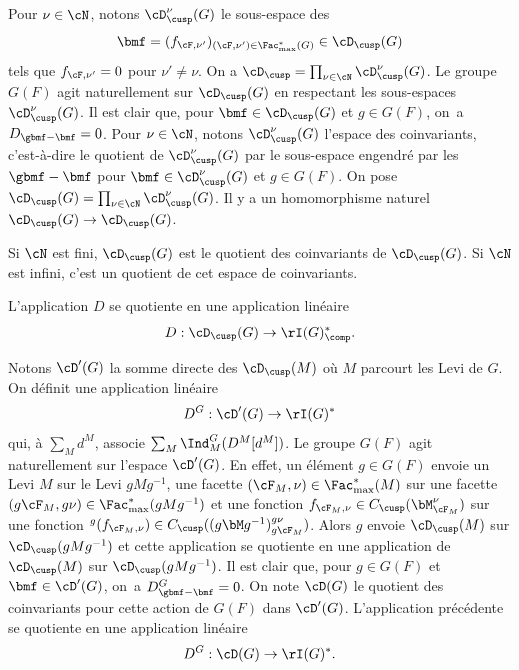 Pour $\nu\in \cN$, notons $\boldsymbol{\cD}^{\nu}_{\cusp}(G)$ le sous-espace des
\[
\bmf=(f_{\cF,\nu'})_{(\cF,\nu')\in \Fac^*_{\max}(G)}\in \boldsymbol{\cD}_{\cusp}(G)
\]
tels que $f_{\cF,\nu'}=0$ pour $\nu'\neq\nu$. On a $\boldsymbol{\cD}_{\cusp}=\prod_{\nu\in \cN}\boldsymbol{\cD}^{\nu}_{\cusp}(G)$.
Le groupe $G(F)$ agit naturellement sur $\boldsymbol{\cD}_{\cusp}(G)$ en respectant les sous-espaces $\boldsymbol{\cD}_{\cusp}^{\nu}(G)$. Il est clair que, pour $\bmf\in \boldsymbol{\cD}_{\cusp}(G)$ et $g\in G(F)$, on~a $D_{{\gbmf}-\bmf}=0$. Pour $\nu\in \cN$, notons $\cD^{\nu}_{\cusp}(G)$ l'espace des coinvariants, c'est-à-dire le quotient de $\boldsymbol{\cD}^{\nu}_{\cusp}(G)$ par le sous-espace engendré par les ${\gbmf}-\bmf$ pour $\bmf\in \boldsymbol{\cD}^{\nu}_{\cusp}(G)$ et $g\in G(F)$. On pose $\cD_{\cusp}(G)=\prod_{\nu\in \cN}\cD^{\nu}_{\cusp}(G)$. Il y a un homomorphisme naturel $\boldsymbol{\cD}_{\cusp}(G)\to\cD_{\cusp}(G)$.

\begin{rem*}
Si $\cN$ est fini, $\cD_{\cusp}(G)$ est le quotient des coinvariants de $\boldsymbol{\cD}_{\cusp}(G)$. Si $\cN$ est infini, c'est un quotient de cet espace de coinvariants.
\end{rem*}

L'application $D$ se quotiente en une application linéaire
\[
D:\cD_{\cusp}(G)\to \rI(G)_{\comp}^*.
\]

Notons $\cD'(G)$ la somme directe des $\cD_{\cusp}(M)$ où $M$ parcourt les Levi de $G$. On définit une application linéaire
\[
D^G: \cD'(G)\to \rI(G)^*
\]
qui, à $\sum_{M}d^M$, associe $\sum_{M}\Ind_{M}^G(D^M[d^M])$.
Le groupe $G(F)$ agit naturellement sur l'espace $\cD'(G)$. En effet, un élément $g\in G(F)$ envoie un Levi $M$ sur le Levi $gMg^{-1}$, une facette $(\cF_{M},\nu)\in \Fac^*_{\max}(M)$ sur une facette $(g\cF_{M},g\nu)\in \Fac^*_{\max}(gMg^{-1})$ et une fonction $f_{\cF_{M},\nu}\in C_{\cusp}(\bM_{\cF_{M}}^{\nu})$ sur une fonction $^g(f_{\cF_{M},\nu})\in C_{\cusp}(({g\bM g^{-1}})_{g\cF_{M}}^{g\nu})$. Alors $g$ envoie $\boldsymbol{\cD}_{\cusp}(M)$ sur $\boldsymbol{\cD}_{\cusp}(gMg^{-1})$ et cette application se quotiente en une application de $\cD_{\cusp}(M)$ sur $\cD_{\cusp}(gMg^{-1})$.
Il est clair que, pour $g\in G(F)$ et~\hbox{$\bmf\in \cD'(G)$}, on~a $D^G_{{\gbmf}-\bmf}=0$. On note $\cD(G)$ le quotient des coinvariants pour cette action de $G(F)$ dans $\cD'(G)$. L'application précédente se quotiente en une application linéaire
\[
D^G:\cD(G)\to \rI(G)^*.
\]

